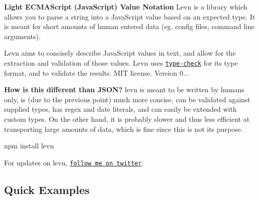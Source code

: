 {\bfseries Light E\+C\+M\+A\+Script (Java\+Script) Value Notation} Levn is a library which allows you to parse a string into a Java\+Script value based on an expected type. It is meant for short amounts of human entered data (eg. config files, command line arguments).

Levn aims to concisely describe Java\+Script values in text, and allow for the extraction and validation of those values. Levn uses \href{https://github.com/gkz/type-check}{\tt type-\/check} for its type format, and to validate the results. M\+I\+T license. Version 0...

{\bfseries How is this different than J\+S\+O\+N?} levn is meant to be written by humans only, is (due to the previous point) much more concise, can be validated against supplied types, has regex and date literals, and can easily be extended with custom types. On the other hand, it is probably slower and thus less efficient at transporting large amounts of data, which is fine since this is not its purpose. \begin{DoxyVerb}npm install levn
\end{DoxyVerb}


For updates on levn, \href{https://twitter.com/gkzahariev}{\tt follow me on twitter}.

\subsection*{Quick Examples}


